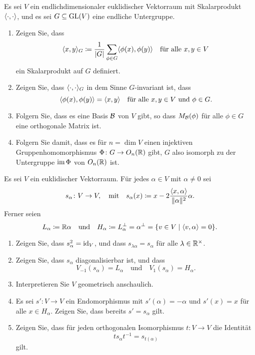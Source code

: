 \documentclass[a4paper,10pt]{scrartcl}
\begin{document}
\begin{question}
  Es sei $V$ ein endlichdimensionaler euklidischer Vektorraum mit Skalarprodukt $\langle \cdot, \cdot \rangle$, und es sei $G \subseteq \operatorname{GL}(V)$ eine endliche Untergruppe.
  \begin{enumerate}[leftmargin=*]
    \item
      Zeigen Sie, dass
      \[
        \langle x,y \rangle_G \coloneqq \frac{1}{|G|} \sum_{\phi \in G} \langle \phi(x), \phi(y) \rangle
        \quad
        \text{für alle $x, y \in V$}
      \]
      ein Skalarprodukt auf $G$ definiert.
    \item
      Zeigen Sie, dass $\langle \cdot, \cdot \rangle_G$ in dem Sinne $G$-invariant ist, dass
      \[
        \langle \phi(x), \phi(y) \rangle = \langle x,y \rangle
        \quad
        \text{für alle $x, y \in V$ und $\phi \in G$}.
      \]
    \item
      Folgern Sie, dass es eine Basis $\mathcal{B}$ von $V$ gibt, so dass $M_{\mathcal{B}}(\phi)$ für alle $\phi \in G$ eine orthogonale Matrix ist.
    \item
      Folgern Sie damit, dass es für $n = \dim V$ einen injektiven Gruppenhomomorphismus $\Phi \colon G \to O_n(\mathbb{R})$ gibt, $G$ also isomorph zu der Untergruppe $\operatorname{im} \Phi$ von $O_n(\mathbb{R})$ ist.
  \end{enumerate}
\end{question}


\begin{question}
  Es sei $V$ ein euklidischer Vektorraum.
  Für jedes $\alpha \in V$ mit $\alpha \neq 0$ sei
  \[
    s_\alpha \colon V \to V,
    \quad\text{mit}\quad
              s_\alpha(x)
    \coloneqq x - 2 \frac{\langle x, \alpha \rangle}{\|\alpha\|^2} \alpha.
  \]
  Ferner seien
  \[
              L_\alpha
    \coloneqq \mathbb{R} \alpha
    \quad\text{und}\quad
              H_\alpha
    \coloneqq L_\alpha^\perp
    =         \alpha^\perp
    =         \{ v \in V \mid \langle v, \alpha \rangle = 0 \}.
  \]
  \begin{enumerate}[leftmargin=*]
    \item
      Zeigen Sie, dass $s_\alpha^2 = \operatorname{id}_V$, und dass $s_{\lambda \alpha} = s_\alpha$ für alle $\lambda \in \mathbb{R}^\times$.
    \item
      Zeigen Sie, dass $s_\alpha$ diagonalisierbar ist, und dass
      \[
        V_{-1}(s_\alpha) = L_\alpha
        \quad\text{und}\quad
        V_1(s_\alpha) = H_\alpha.
      \]
    \item
      Interpretieren Sie $V$ geometrisch anschaulich.
    \item
      Es sei $s' \colon V \to V$ ein Endomorphismus mit $s'(\alpha) = -\alpha$ und $s'(x) = x$ für alle $x \in H_\alpha$.
      Zeigen Sie, dass bereits $s' = s_\alpha$ gilt.
    \item
      Zeigen Sie, dass für jeden orthogonalen Isomorphismus $t \colon V \to V$ die Identität
      \[
        t s_\alpha t^{-1} = s_{t(\alpha)}
      \]
      gilt.
  \end{enumerate}
\end{question}
\end{document}
